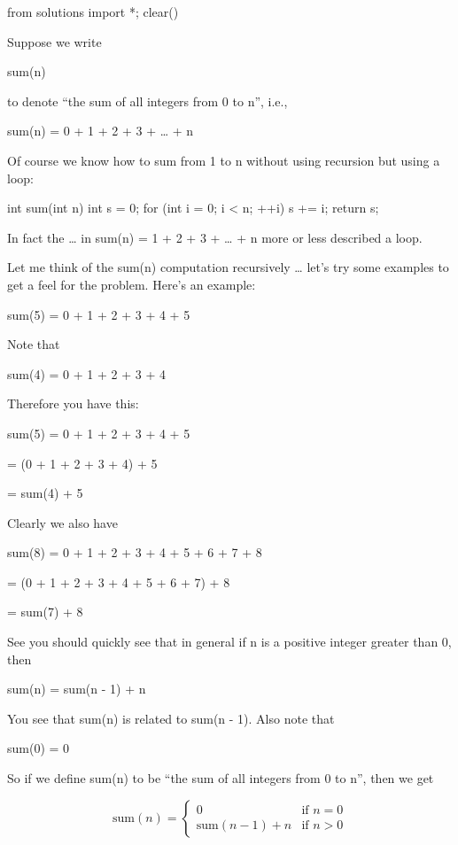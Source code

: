 \begin{python0}
from solutions import *; clear()
\end{python0}

Suppose we write

sum(n)

to denote ``the sum of all integers from 0 to n'', i.e.,

sum(n) = 0 + 1 + 2 + 3 + \ldots{} + n

Of course we know how to sum from 1 to n without using recursion but
using a loop:

\begin{consolethree}[escapeinside=||]
int sum(int n)
{
    int s = 0;
    for (int i = 0; i < n; ++i)
    {
        s += i;
    }
    return s;
}
\end{consolethree}

In fact the \ldots{} in sum(n) = 1 + 2 + 3 + \ldots{} + n more or less described a loop.

Let me think of the sum(n) computation recursively \ldots{} let's try
some examples to get a feel for the problem. Here's an
example:

sum(5) = 0 + 1 + 2 + 3 + 4 + 5

Note that

sum(4) = 0 + 1 + 2 + 3 + 4

Therefore you have this:

sum(5) = 0 + 1 + 2 + 3 + 4 + 5

= (0 + 1 + 2 + 3 + 4) + 5

= sum(4) + 5

Clearly we also have

sum(8) = 0 + 1 + 2 + 3 + 4 + 5 + 6 + 7 + 8

= (0 + 1 + 2 + 3 + 4 + 5 + 6 + 7) + 8

= sum(7) + 8

See you should quickly see that in general if n is a positive integer
greater than 0, then

sum(n) = sum(n - 1) + n

You see that sum(n) is related to sum(n - 1). Also note that

sum(0) = 0

So if we define sum(n) to be ``the sum of all integers from 0 to n'',
then we get

\[
\text{sum}(n) = \begin{cases}
0 & \text{if } n = 0 \\
\text{sum}(n - 1) + n & \text{if } n > 0
\end{cases}
\]

